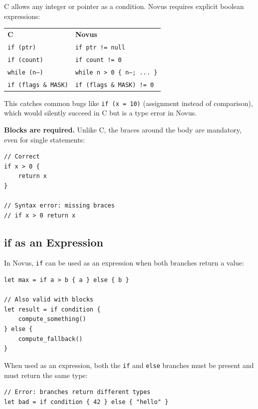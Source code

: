 \begin{comingfromc}
C allows any integer or pointer as a condition. Novus requires explicit boolean expressions:

\begin{tabular}{ll}
\textbf{C} & \textbf{Novus} \\
\texttt{if (ptr)} & \texttt{if ptr != null} \\
\texttt{if (count)} & \texttt{if count != 0} \\
\texttt{while (n--)} & \texttt{while n > 0 \{ n--; ... \}} \\
\texttt{if (flags \& MASK)} & \texttt{if (flags \& MASK) != 0} \\
\end{tabular}

This catches common bugs like \texttt{if (x = 10)} (assignment instead of comparison), which would silently succeed in C but is a type error in Novus.
\end{comingfromc}

\textbf{Blocks are required.} Unlike C, the braces around the body are mandatory, even for single statements:

\begin{lstlisting}
// Correct
if x > 0 {
    return x
}

// Syntax error: missing braces
// if x > 0 return x
\end{lstlisting}

\subsection{if as an Expression}
\label{subsec:if-expression}

In Novus, \texttt{if} can be used as an expression when both branches return a value:

\begin{lstlisting}
let max = if a > b { a } else { b }

// Also valid with blocks
let result = if condition {
    compute_something()
} else {
    compute_fallback()
}
\end{lstlisting}

When used as an expression, both the \texttt{if} and \texttt{else} branches must be present and must return the same type:

\begin{lstlisting}
// Error: branches return different types
let bad = if condition { 42 } else { "hello" }
\end{lstlisting}

